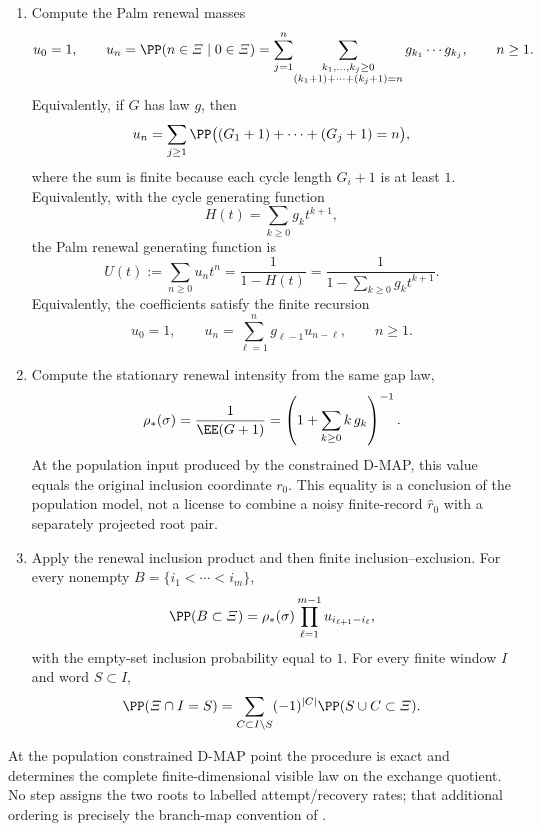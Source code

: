 \begin{proposition}
\begin{enumerate}
\item Compute the Palm renewal masses
\[
u_0=1,\qquad
u_n=\PP(n\in\varXi\mid0\in\varXi)
    =\sum_{j=1}^{n}\!
      \sum_{\substack{k_1,\ldots,k_j\ge0\\
      (k_1+1)+\cdots+(k_j+1)=n}}
      g_{k_1}\cdots g_{k_j},
\qquad n\ge1 .
\]
Equivalently, if \(G\) has law \(g\), then
\[
u_n=\sum_{j\ge1}\PP\bigl((G_1+1)+\cdots+(G_j+1)=n\bigr),
\]
where the sum is finite because each cycle length \(G_i+1\) is at least
\(1\).
Equivalently, with the cycle generating function
\[
H(t)=\sum_{k\ge0}g_k t^{k+1},
\]
the Palm renewal generating function is
\begin{equation}\label{eq:renewal-generating-function-complete-law-main}
U(t):=\sum_{n\ge0}u_n t^n
=\frac{1}{1-H(t)}
=\frac{1}{1-\sum_{k\ge0}g_k t^{k+1}} .
\end{equation}
Equivalently, the coefficients satisfy the finite recursion
\begin{equation}\label{eq:finite-window-renewal-recursion-main}
u_0=1,\qquad
u_n=\sum_{\ell=1}^{n}g_{\ell-1}u_{n-\ell},
\qquad n\ge1 .
\end{equation}

\item Compute the stationary renewal intensity from the same gap law,
\begin{equation}\label{eq:algorithmic-rho-star-main}
\rho_*(\sigma)
=\frac{1}{\EE(G+1)}
=\left(1+\sum_{k\ge0}k\,g_k\right)^{-1}.
\end{equation}
At the population input produced by the constrained D-MAP, this value equals
the original inclusion coordinate \(r_0\).  This equality is a conclusion of
the population model, not a license to combine a noisy finite-record
\(\widehat r_0\) with a separately projected root pair.

\item Apply the renewal inclusion product and then finite
inclusion--exclusion.  For every nonempty
\(B=\{i_1<\cdots<i_m\}\),
\begin{equation}\label{eq:algorithmic-reconstruction-inclusion-main}
\PP(B\subset\varXi)
=\rho_*(\sigma)\prod_{\ell=1}^{m-1}u_{i_{\ell+1}-i_\ell},
\end{equation}
with the empty-set inclusion probability equal to \(1\).  For every finite
window \(I\) and word \(S\subset I\),
\begin{equation}\label{eq:algorithmic-reconstruction-word-main}
\PP(\varXi\cap I=S)
=\sum_{C\subset I\setminus S}(-1)^{|C|}
\PP(S\cup C\subset\varXi).
\end{equation}
\end{enumerate}

At the population constrained D-MAP point the procedure is exact and
determines the complete finite-dimensional visible law on the exchange
quotient.  No step assigns the two roots to labelled attempt/recovery rates;
that additional ordering is precisely the branch-map convention of
.
\end{proposition}


